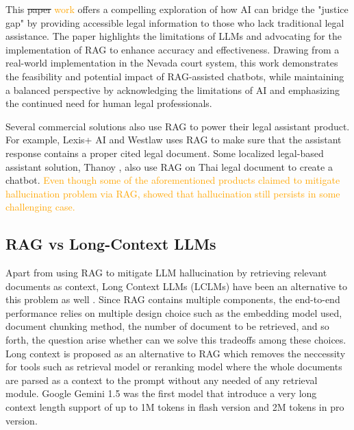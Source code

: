 This \st{paper} \textcolor{orange}{work} \cite{Ajmi2024} offers a compelling exploration of how AI can bridge the "justice gap" by providing accessible legal information to those who lack traditional legal assistance. The paper highlights the limitations of LLMs and advocating for the implementation of RAG to enhance accuracy and effectiveness. Drawing from a real-world implementation in the Nevada court system, this work demonstrates the feasibility and potential impact of RAG-assisted chatbots, while maintaining a balanced perspective by acknowledging the limitations of AI and emphasizing the continued need for human legal professionals.

Several commercial solutions also use RAG to power their legal assistant product. For example, Lexis+ AI \cite{lexisnexis} and Westlaw \cite{thomsonreutersAIpoweredLegal} uses RAG to make sure that the assistant response contains a proper cited legal document. Some localized legal-based assistant solution, Thanoy \cite{thanoy}, also use RAG on Thai legal document to create a chatbot. \textcolor{orange}{Even though some of the aforementioned products claimed to mitigate hallucination problem via RAG, \cite{magesh2024hallucinationfreeassessingreliabilityleading} showed that hallucination still persists in some challenging case.}


\subsection{RAG vs Long-Context LLMs}

{
Apart from using RAG to mitigate LLM hallucination by retrieving relevant documents as context, Long Context LLMs (LCLMs) have been an alternative to this problem as well \cite{laban2024summaryhaystackchallengelongcontext, loft}. 
Since RAG contains multiple components, the end-to-end performance relies on multiple design choice such as the embedding model used, document chunking method, the number of document to be retrieved, and so forth, the question arise whether can we solve this tradeoffs among these choices. 
Long context is proposed as an alternative to RAG which removes the neccessity for tools such as retrieval model or reranking model where the whole documents are parsed as a context to the prompt without any needed of any retrieval module.
Google Gemini 1.5 \cite{gemini1.5} was the first model that introduce a very long context length support of up to 1M tokens in flash version and 2M tokens in pro version. 

}

